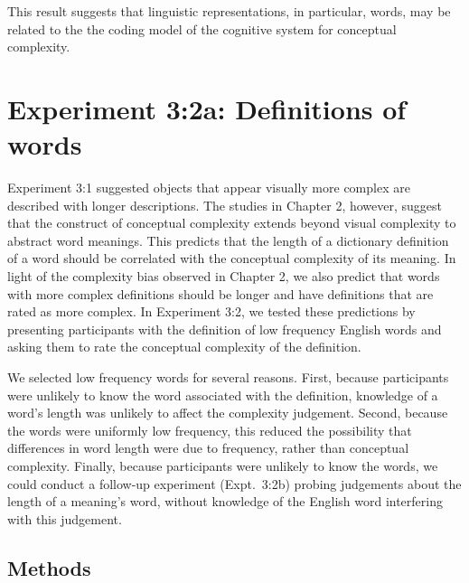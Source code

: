 This result suggests that linguistic representations, in particular, words, may be related to the the coding model of the cognitive system for conceptual complexity.

\section{Experiment 3:2a: Definitions of words}
Experiment 3:1 suggested objects that appear visually more complex are described with longer descriptions. The studies in Chapter 2, however, suggest that the construct of conceptual complexity extends beyond visual complexity to abstract word meanings. This predicts that the length of a dictionary definition of a word should be correlated with the conceptual complexity of its meaning. In light of the complexity bias observed in Chapter 2, we also predict that words with more complex definitions should be longer and have definitions that are rated as more complex. In Experiment 3:2, we tested these predictions by presenting participants with the definition of low frequency English words  and asking them to rate the conceptual complexity of the definition.

We selected low frequency words for several reasons. First, because participants were unlikely to know the word associated with the definition, knowledge of a word's length was unlikely to affect the complexity judgement. Second, because the words were uniformly low frequency, this reduced the possibility that differences in word length were due to frequency, rather than conceptual complexity. Finally, because participants were unlikely to know the words, we could conduct a follow-up experiment (Expt.\ 3:2b) probing judgements about the length of a meaning's word, without knowledge of the English word interfering with this judgement.

\subsection{Methods}



